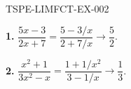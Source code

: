 \begin{corrige}{TSPE-LIMFCT-EX-002}


\textbf{1.} $\dfrac{5x-3}{2x+7} = \dfrac{5-3/x}{2+7/x} \to \boxed{\dfrac{5}{2}}$.

\textbf{2.} $\dfrac{x^2+1}{3x^2-x} = \dfrac{1+1/x^2}{3-1/x} \to \boxed{\dfrac{1}{3}}$.

\end{corrige}
